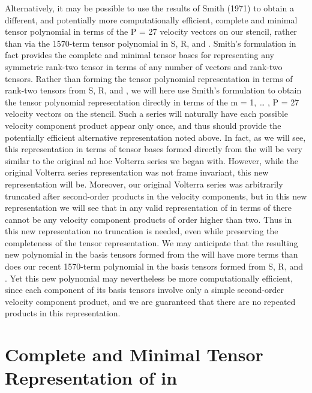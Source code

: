 Alternatively, it may be possible to use the results of Smith (1971) to obtain a different, and potentially more computationally efficient, complete and minimal tensor polynomial in terms of the P = 27 velocity vectors   on our   stencil, rather than via the 1570-term tensor polynomial in S, R,   and  . Smith’s formulation in fact provides the complete and minimal tensor bases for representing any symmetric rank-two tensor in terms of any number of vectors and rank-two tensors.  Rather than forming the tensor polynomial representation in terms of rank-two tensors from S, R,   and  , we will here use Smith’s formulation to obtain the tensor polynomial representation directly in terms of the m = 1, … , P = 27 velocity vectors   on the stencil.  Such a series will naturally have each possible velocity component product appear only once, and thus should provide the potentially efficient alternative representation noted above.
In fact, as we will see, this  representation in terms of tensor bases formed directly from the   will be very similar to the original ad hoc Volterra series we began with.  However, while the original Volterra series representation was not frame invariant, this new representation will be. Moreover, our original Volterra series was arbitrarily truncated after second-order products in the velocity components, but in this new representation we will see that in any valid representation of   in terms of   there cannot be any velocity component products of order higher than two. Thus in this new representation no truncation is needed, even while preserving the completeness of the tensor representation. 
We may anticipate that the resulting new polynomial in the basis tensors formed from the   will have more terms than does our recent 1570-term polynomial in the basis tensors formed from S, R,   and  .  Yet this new polynomial may nevertheless be more computationally efficient, since each component of its basis tensors involve only a simple second-order velocity component product, and we are guaranteed that there are no repeated products in this representation. 

\section{Complete and Minimal Tensor Representation of   in  } 

